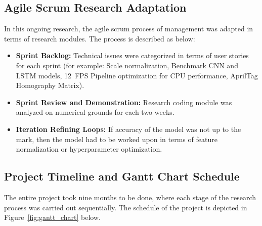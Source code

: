 \subsection{Agile Scrum Research Adaptation}
In this ongoing research, the agile scrum process of management was adapted in terms of research modules. The process is described as below:
\begin{itemize}
    \item \textbf{Sprint Backlog:} Technical issues were categorized in terms of user stories for each sprint (for example: Scale normalization, Benchmark CNN and LSTM models, 12~FPS Pipeline optimization for CPU performance, AprilTag Homography Matrix).
    \item \textbf{Sprint Review and Demonstration:} Research coding module was analyzed on numerical grounds for each two weeks.
    \item \textbf{Iteration Refining Loops:} If accuracy of the model was not up to the mark, then the model had to be worked upon in terms of feature normalization or hyperparameter optimization.
\end{itemize}

\subsection{Project Timeline and Gantt Chart Schedule}
The entire project took nine months to be done, where each stage of the research process was carried out sequentially. The schedule of the project is depicted in Figure~\ref{fig:gantt_chart} below.

